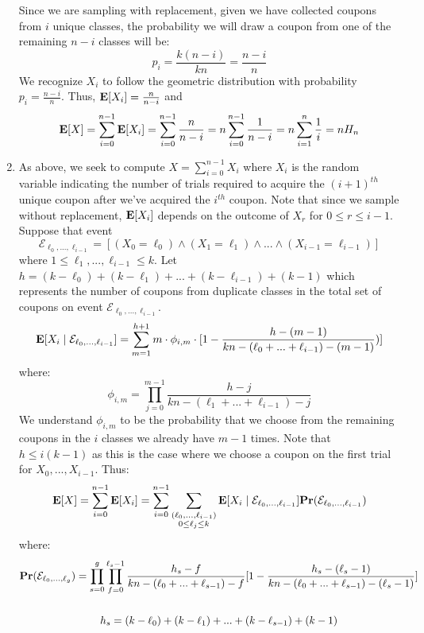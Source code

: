 \documentclass[12pt]{article}%
\begin{document}
\begin{enumerate}
  Since we are sampling with replacement, given we have collected coupons from $i$ unique classes, the probability we will draw a coupon from one of the remaining $n-i$ classes will be:
  $$p_i = \frac{k(n - i)}{kn} = \frac{n - i}{n} $$
  We recognize $X_i$ to follow the geometric distribution with probability $p_i = \frac{n-i}{n}$.
  Thus, ${\bf E}[X_i] = \frac{n}{n-i}$
  and $${\bf E}[X] = \sum_{i=0}^{n-1} {\bf E}[X_i] = \sum_{i=0}^{n-1} \frac{n}{n-i} = n \sum_{i=0}^{n-1}\frac{1}{n-i} = n \sum_{i=1}^n \frac{1}{i} = n H_n$$
\item As above, we seek to compute $X = \sum_{i=0}^{n-1} X_i$ where $X_i$ is the random variable indicating the number of trials required to acquire the $(i+1)^{th}$ unique coupon after we've acquired the $i^{th}$ coupon. Note that since we sample without replacement, ${\bf E}[X_i]$ depends on the outcome of $X_r$ for $0 \leq r \leq i-1$. Suppose that event $$\mathcal{E}_{\ell_0,...,\ell_{i-1}} = [(X_0=\ell_0) \wedge (X_1=\ell_1) \wedge ... \wedge (X_{i-1} = \ell_{i-1})]$$ where $1 \leq \ell_1,...,\ell_{i-1} \leq k$. Let $h = (k - \ell_0) + (k - \ell_1) + ... + (k - \ell_{i-1}) + (k-1)$ which represents the number of coupons from duplicate classes in the total set of coupons on event $\mathcal{E}_{\ell_0,...,\ell_{i-1}}$.
  $$ {\bf E}[X_i \mid \mathcal{E}_{\ell_0,...,\ell_{i-1}}] = \sum_{m=1}^{h+1} m \cdot \phi_{i,m} \cdot [1 - \frac{h - (m-1)}{kn - (\ell_0 + ... + \ell_{i-1})-(m-1)})]$$
  where:
  $$\phi_{i,m} =  \prod_{j=0}^{m-1}\frac{h-j}{kn-(\ell_1 + ... + \ell_{i-1})-j}$$
  We understand $\phi_{i,m}$ to be the probability that we choose from the remaining coupons in the $i$ classes we already have $m-1$ times. Note that $h \leq i(k-1)$ as this is the case where we choose a coupon on the first trial for $X_0,...,X_{i-1}$. Thus:
  $$ {\bf E}[X] = \sum_{i=0}^{n-1}{\bf E}[X_i] = \sum_{i=0}^{n-1}\sum_{\substack{(\ell_0,...,\ell_{i-1}) \\ 0 \leq \ell_j \leq k}} {\bf E}[X_i \mid \mathcal{E}_{\ell_0,...,\ell_{i-1}}] {\bf Pr}(\mathcal{E}_{\ell_0,...,\ell_{i-1}})$$
  where:
  \begin{gather*}
  {\bf Pr}(\mathcal{E}_{\ell_0,...,\ell_{g}}) = \prod_{s = 0}^{g}\prod_{f = 0}^{\ell_{s}-1} \frac{h_s-f}{kn - (\ell_0 + ... + \ell_{s-1})-f} [1 -\frac{h_s - (\ell_{s} -1)}{kn - (\ell_0 + ... + \ell_{s-1}) - (\ell_s - 1)}] \\ \\
  h_s = (k - \ell_0) + (k - \ell_1) + ... + (k - \ell_{s-1}) + (k-1)
\end{gather*}
\end{enumerate}
\end{document}
